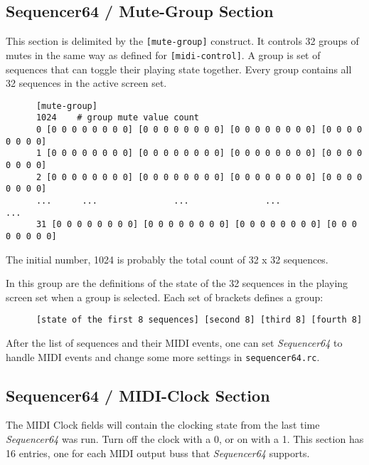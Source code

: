 \subsection{Sequencer64 / Mute-Group Section}
\label{subsec:seq64_rc_file_mute_group}
     
   This section is delimited by the \texttt{[mute-group]} construct.
   It controls 32 groups of mutes in the same way as defined for
   \texttt{[midi-control]}. A group is set of sequences that can toggle their
   playing state together.  Every group contains all 32 sequences in the
   active screen set.

   \begin{verbatim}
      [mute-group]
      1024    # group mute value count
      0 [0 0 0 0 0 0 0 0] [0 0 0 0 0 0 0 0] [0 0 0 0 0 0 0 0] [0 0 0 0 0 0 0 0]
      1 [0 0 0 0 0 0 0 0] [0 0 0 0 0 0 0 0] [0 0 0 0 0 0 0 0] [0 0 0 0 0 0 0 0]
      2 [0 0 0 0 0 0 0 0] [0 0 0 0 0 0 0 0] [0 0 0 0 0 0 0 0] [0 0 0 0 0 0 0 0]
      ...      ...               ...               ...               ...
      31 [0 0 0 0 0 0 0 0] [0 0 0 0 0 0 0 0] [0 0 0 0 0 0 0 0] [0 0 0 0 0 0 0 0]
   \end{verbatim}

   The initial number, 1024 is probably the total count of 32 x 32 sequences.

   In this group are the definitions of the state of the 32 sequences
   in the playing screen set when a group is selected.
   Each set of brackets defines a group:
   
   \begin{verbatim}
      [state of the first 8 sequences] [second 8] [third 8] [fourth 8]
   \end{verbatim}

   After the list of sequences and their MIDI events, one can 
   set \textsl{Sequencer64} to handle MIDI events and change some more settings
   in \texttt{sequencer64.rc}.

\subsection{Sequencer64 / MIDI-Clock Section}
\label{subsec:seq64_rc_file_midi_clock}

   The MIDI Clock fields will contain the clocking state from the last 
   time \textsl{Sequencer64} was run.  Turn off the clock with a 0, or on
   with a 1.
   This section has 16 entries, one for each MIDI output buss that
   \textsl{Sequencer64} supports.

